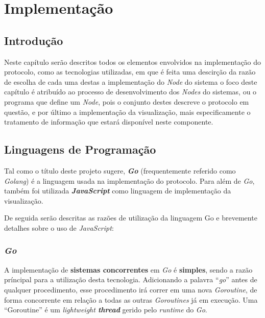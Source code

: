 \chapter{Implementação}
\label{chap:imp}

\section{Introdução}
\label{chap4:sec:intro}

Neste capítulo serão descritos todos os elementos envolvidos na implementação do protocolo,
como as tecnologias utilizadas, em que é feita uma descirção da razão de escolha de cada uma destas
a implementação do \emph{Node} do sistema
o foco deste capítulo é atribuído ao processo de desenvolvimento dos \emph{Nodes} do sistemas, ou o programa que define um \emph{Node}, pois o conjunto destes descreve o protocolo em questão, e por último a implementação da visualização, mais especificamente o tratamento de informação que estará disponível neste componente. 


\section{Linguagens de Programação}
\label{chap3:linguagens}
Tal como o título deste projeto sugere, \textbf{\emph{Go}} (frequentemente referido como \emph{Golang}) é a linguagem usada na implementação do protocolo. Para além de \emph{Go}, também foi utilizada \textbf{\emph{JavaScript}} como linguagem de implementação da visualização.

De seguida serão descritas as razões de utilização da linguagem Go e brevemente detalhes sobre o uso de \emph{JavaScript}:



\subsection*{\emph{Go}}

A implementação de \textbf{sistemas concorrentes} em \emph{Go} é \textbf{simples}, sendo a razão príncipal para a utilização desta tecnologia. 
Adicionando a palavra ``\emph{go}'' antes de qualquer procedimento, esse procedimento irá correr em uma nova \emph{Goroutine}, de forma concorrente em relação a todas as outras \emph{Goroutines} já em execução.
Uma ``Goroutine'' é um \emph{lightweight \textbf{thread}} gerido pelo \emph{runtime} do \emph{Go}.




